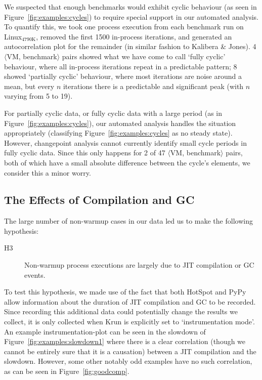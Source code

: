 \documentclass[acmlarge]{acmart}\settopmatter{printfolios=true}
\newcommand{\kalibera}{Kalibera \& Jones\xspace}
\newcommand{\krun}{Krun\xspace}
\newcommand{\bencherthree}{Linux$_\mathrm{4790K}$\xspace}
\newcommand{\vmbpair}{$\langle$VM, benchmark$\rangle$\xspace}
\begin{document}
We suspected that enough benchmarks
would exhibit cyclic behaviour (as seen in Figure~\ref{fig:examples:cycles}) to
require special support in our automated analysis. To quantify this, we took one process
execution from each benchmark run on \bencherthree, removed the first 1500
in-process iterations, and generated an autocorrelation plot for the remainder
(in similar fashion to \kalibera). 4 \vmbpair pairs showed what we have come to
call `fully cyclic' behaviour, where all in-process iterations repeat in a
predictable pattern; 8 showed `partially cyclic' behaviour, where
most iterations are noise around a mean, but every $n$ iterations there is a
predictable and significant peak (with $n$ varying from 5 to 19).

For partially cyclic data, or fully cyclic data with a large period (as in
Figure~\ref{fig:examples:cycles}), our automated analysis handles the situation
appropriately (classifying Figure~\ref{fig:examples:cycles} as no steady state).
However, changepoint analysis cannot currently identify small cycle periods in
fully cyclic data. Since this only happens for 2
of 47 \vmbpair pairs, both of which have a small absolute difference between the
cycle's elements, we consider this a minor worry.


\subsection{The Effects of Compilation and GC}
\label{sec:deepdive}

The large number of non-warmup cases in our data led us to make the following hypothesis:
\begin{description}
  \item[H3] Non-warmup process executions are largely due to JIT compilation or GC events.
\end{description}
To test this hypothesis, we made use of the fact that both HotSpot and PyPy allow
information about the duration of JIT compilation and GC to be recorded. Since
recording this additional data could potentially change the results we collect,
it is only collected when \krun is explicitly set to `instrumentation mode'. An
example instrumentation-plot can be seen in the slowdown of
Figure~\ref{fig:examples:slowdown1} where there is a clear correlation (though we
cannot be entirely sure that it is a causation) between a JIT compilation and
the slowdown. However, some other notably odd examples have no such correlation,
as can be seen in Figure~\ref{fig:goodcomp}.
\end{document}
